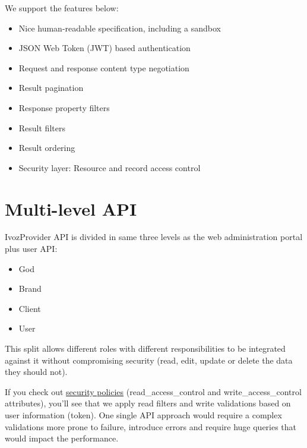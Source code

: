 \documentclass[letterpaper,10pt,english]{sphinxmanual}
\begin{document}
We support the features below:
\begin{itemize}
\item {} 
Nice human-readable specification, including a sandbox

\item {} 
JSON Web Token (JWT) based authentication

\item {} 
Request and response content type negotiation

\item {} 
Result pagination

\item {} 
Response property filters

\item {} 
Result filters

\item {} 
Result ordering

\item {} 
Security layer: Resource and record access control

\end{itemize}


\chapter{Multi-level API}
\label{api_rest/multilevel::doc}\label{api_rest/multilevel:multi-level-api}
IvozProvider API is divided in same three levels as the web administration portal plus user API:
\begin{itemize}
\item {} 
God

\item {} 
Brand

\item {} 
Client

\item {} 
User

\end{itemize}

This split allows different roles with different responsibilities to be integrated against it without compromising
security (read, edit, update or delete the data they should not).

If you check out \href{https://github.com/irontec/ivozprovider/blob/main/web/rest/brand/config/api/raw/provider.yml}{security policies}
(read\_access\_control and write\_access\_control attributes), you’ll see that we apply
read filters and write validations based on user information (token). One single API approach would require a complex
validations more prone to failure, introduce errors and require huge queries that would impact the performance.
\end{document}

